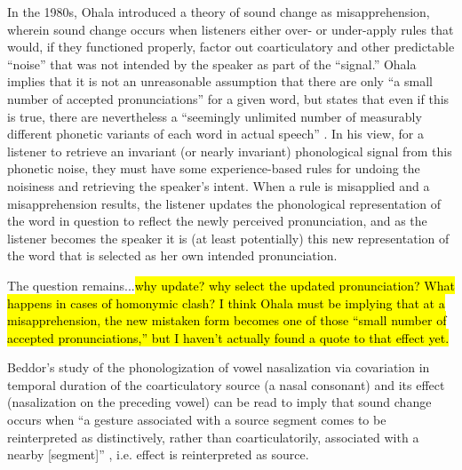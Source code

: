     In the 1980s, Ohala introduced a theory of sound change as misapprehension, wherein sound change occurs when listeners either over- or under-apply rules that would, if they functioned properly, factor out coarticulatory and other predictable ``noise'' that was not intended by the speaker as part of the ``signal.'' Ohala implies that it is not an unreasonable assumption that there are only ``a small number of accepted pronunciations'' for a given word, but states that even if this is true, there are nevertheless a ``seemingly unlimited number of measurably different phonetic variants of each word in actual speech'' \citeyearpar[p.179]{ohala1981sound}. In his view, for a listener to retrieve an invariant (or nearly invariant) phonological signal from this phonetic noise, they must have some experience-based rules for undoing the noisiness and retrieving the speaker's intent. When a rule is misapplied and a misapprehension results, the listener updates the phonological representation of the word in question to reflect the newly perceived pronunciation, and as the listener becomes the speaker it is (at least potentially) this new representation of the word that is selected as her own intended pronunciation.
    
    The question remains...\hl{why update? why select the updated pronunciation? What happens in cases of homonymic clash? I think Ohala must be implying that at a misapprehension, the new mistaken form becomes one of those ``small number of accepted pronunciations,'' but I haven't actually found a quote to that effect yet.}
    
    Beddor's study of the phonologization of vowel nasalization via covariation in temporal duration of the coarticulatory source (a nasal consonant) and its effect (nasalization on the preceding vowel) can be read to imply that sound change occurs when ``a gesture associated with a source segment comes to be reinterpreted as distinctively, rather than coarticulatorily, associated with a nearby [segment]'' \citeyearpar[p.785]{beddor2009coarticulatory}, i.e. effect is reinterpreted as source.
    
